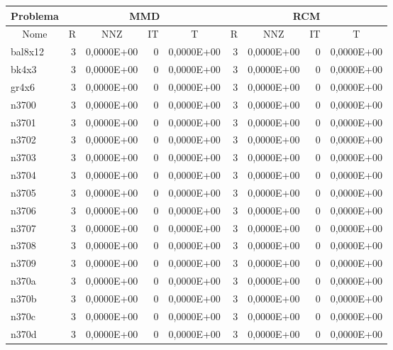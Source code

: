 \begin{tabular}{|l|r|r|r|r|r|r|r|r|}
\hline
\multicolumn{1}{|c|}{Problema} & \multicolumn{4}{|c|}{MMD} &         \multicolumn{4}{|c|}{RCM} \\ \hline
\multicolumn{1}{|c|}{Nome} & \multicolumn{1}{|c|}{R} &
        \multicolumn{1}{|c|}{NNZ} & \multicolumn{1}{|c|}{IT} &
        \multicolumn{1}{|c|}{T} & \multicolumn{1}{|c|}{R} &
        \multicolumn{1}{|c|}{NNZ} & \multicolumn{1}{|c|}{IT} &
        \multicolumn{1}{|c|}{T} \\ \hline
bal8x12 & 3 & 0,0000E+00 & 0 & 0,0000E+00 & 3 & 0,0000E+00 & 0 & 0,0000E+00 \\ \hline
bk4x3 & 3 & 0,0000E+00 & 0 & 0,0000E+00 & 3 & 0,0000E+00 & 0 & 0,0000E+00 \\ \hline
gr4x6 & 3 & 0,0000E+00 & 0 & 0,0000E+00 & 3 & 0,0000E+00 & 0 & 0,0000E+00 \\ \hline
n3700 & 3 & 0,0000E+00 & 0 & 0,0000E+00 & 3 & 0,0000E+00 & 0 & 0,0000E+00 \\ \hline
n3701 & 3 & 0,0000E+00 & 0 & 0,0000E+00 & 3 & 0,0000E+00 & 0 & 0,0000E+00 \\ \hline
n3702 & 3 & 0,0000E+00 & 0 & 0,0000E+00 & 3 & 0,0000E+00 & 0 & 0,0000E+00 \\ \hline
n3703 & 3 & 0,0000E+00 & 0 & 0,0000E+00 & 3 & 0,0000E+00 & 0 & 0,0000E+00 \\ \hline
n3704 & 3 & 0,0000E+00 & 0 & 0,0000E+00 & 3 & 0,0000E+00 & 0 & 0,0000E+00 \\ \hline
n3705 & 3 & 0,0000E+00 & 0 & 0,0000E+00 & 3 & 0,0000E+00 & 0 & 0,0000E+00 \\ \hline
n3706 & 3 & 0,0000E+00 & 0 & 0,0000E+00 & 3 & 0,0000E+00 & 0 & 0,0000E+00 \\ \hline
n3707 & 3 & 0,0000E+00 & 0 & 0,0000E+00 & 3 & 0,0000E+00 & 0 & 0,0000E+00 \\ \hline
n3708 & 3 & 0,0000E+00 & 0 & 0,0000E+00 & 3 & 0,0000E+00 & 0 & 0,0000E+00 \\ \hline
n3709 & 3 & 0,0000E+00 & 0 & 0,0000E+00 & 3 & 0,0000E+00 & 0 & 0,0000E+00 \\ \hline
n370a & 3 & 0,0000E+00 & 0 & 0,0000E+00 & 3 & 0,0000E+00 & 0 & 0,0000E+00 \\ \hline
n370b & 3 & 0,0000E+00 & 0 & 0,0000E+00 & 3 & 0,0000E+00 & 0 & 0,0000E+00 \\ \hline
n370c & 3 & 0,0000E+00 & 0 & 0,0000E+00 & 3 & 0,0000E+00 & 0 & 0,0000E+00 \\ \hline
n370d & 3 & 0,0000E+00 & 0 & 0,0000E+00 & 3 & 0,0000E+00 & 0 & 0,0000E+00 \\ \hline

\end{tabular}
